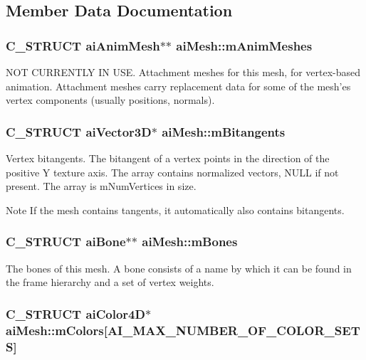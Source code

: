 \subsection{\-Member \-Data \-Documentation}
\hypertarget{structaiMesh_a5078f7db7e99ed05db89dfa412f0e990}{
\subsubsection[{m\-Anim\-Meshes}]{\setlength{\rightskip}{0pt plus 5cm}\-C\-\_\-\-S\-T\-R\-U\-C\-T {\bf ai\-Anim\-Mesh}$\ast$$\ast$ {\bf ai\-Mesh\-::m\-Anim\-Meshes}}}\label{structaiMesh_a5078f7db7e99ed05db89dfa412f0e990}
\-N\-O\-T \-C\-U\-R\-R\-E\-N\-T\-L\-Y \-I\-N \-U\-S\-E. \-Attachment meshes for this mesh, for vertex-\/based animation. \-Attachment meshes carry replacement data for some of the mesh'es vertex components (usually positions, normals). \hypertarget{structaiMesh_ab2a81bfe1731f01271ebab274a8f01c4}{
\subsubsection[{m\-Bitangents}]{\setlength{\rightskip}{0pt plus 5cm}\-C\-\_\-\-S\-T\-R\-U\-C\-T {\bf ai\-Vector3\-D}$\ast$ {\bf ai\-Mesh\-::m\-Bitangents}}}\label{structaiMesh_ab2a81bfe1731f01271ebab274a8f01c4}
\-Vertex bitangents. \-The bitangent of a vertex points in the direction of the positive \-Y texture axis. \-The array contains normalized vectors, \-N\-U\-L\-L if not present. \-The array is m\-Num\-Vertices in size. \begin{DoxyNote}{\-Note}
\-If the mesh contains tangents, it automatically also contains bitangents. 
\end{DoxyNote}
\hypertarget{structaiMesh_a0c0582a7f45b340b6a33552c53232539}{
\subsubsection[{m\-Bones}]{\setlength{\rightskip}{0pt plus 5cm}\-C\-\_\-\-S\-T\-R\-U\-C\-T {\bf ai\-Bone}$\ast$$\ast$ {\bf ai\-Mesh\-::m\-Bones}}}\label{structaiMesh_a0c0582a7f45b340b6a33552c53232539}
\-The bones of this mesh. \-A bone consists of a name by which it can be found in the frame hierarchy and a set of vertex weights. \hypertarget{structaiMesh_ad9215f67bd0c2277b10775a8adb66b96}{
\subsubsection[{m\-Colors}]{\setlength{\rightskip}{0pt plus 5cm}\-C\-\_\-\-S\-T\-R\-U\-C\-T {\bf ai\-Color4\-D}$\ast$ {\bf ai\-Mesh\-::m\-Colors}\mbox{[}{\bf \-A\-I\-\_\-\-M\-A\-X\-\_\-\-N\-U\-M\-B\-E\-R\-\_\-\-O\-F\-\_\-\-C\-O\-L\-O\-R\-\_\-\-S\-E\-T\-S}\mbox{]}}}\label{structaiMesh_ad9215f67bd0c2277b10775a8adb66b96}

